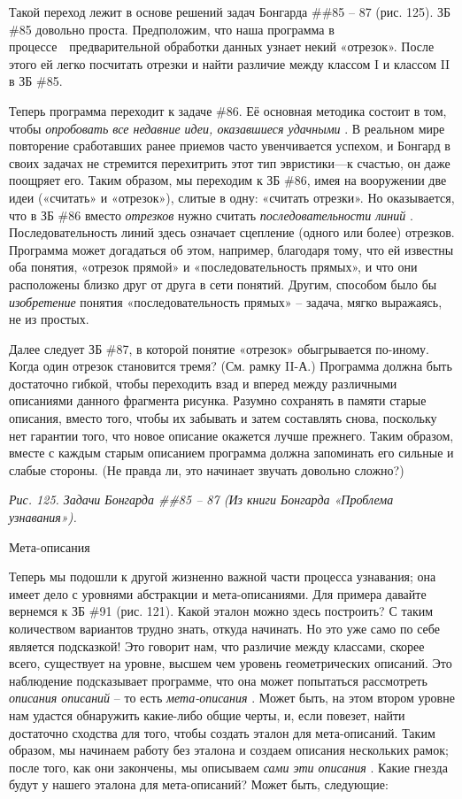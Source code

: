 \documentclass[../main.tex]{subfiles}
\begin{document}
Такой переход лежит в основе решений задач Бонгарда \#\#85 \--- 87 (рис. 125). ЗБ \#85 довольно проста. Предположим, что наша программа в процессе~~предварительной обработки данных узнает некий «отрезок». После этого ей легко посчитать отрезки и найти различие между классом I и классом II в ЗБ \#85.

Теперь программа переходит к задаче \#86. Её основная методика состоит в том, чтобы \emph{опробовать все недавние идеи, оказавшиеся удачными} . В реальном мире повторение сработавших ранее приемов часто увенчивается успехом, и Бонгард в своих задачах не стремится перехитрить этот тип эвристики---к счастью, он даже поощряет его. Таким образом, мы переходим к ЗБ \#86, имея на вооружении две идеи («считать» и «отрезок»), слитые в одну: «считать отрезки». Но оказывается, что в ЗБ \#86 вместо \emph{отрезков} нужно считать \emph{последовательности линий} . Последовательность линий здесь означает сцепление (одного или более) отрезков. Программа может догадаться об этом, например, благодаря тому, что ей известны оба понятия, «отрезок прямой» и «последовательность прямых», и что они расположены близко друг от друга в сети понятий. Другим, способом было бы \emph{изобретение} понятия «последовательность прямых» \--- задача, мягко выражаясь, не из простых.

Далее следует ЗБ \#87, в которой понятие «отрезок» обыгрывается по-иному. Когда один отрезок становится тремя? (См. рамку II-А.) Программа должна быть достаточно гибкой, чтобы переходить взад и вперед между различными описаниями данного фрагмента рисунка. Разумно сохранять в памяти старые описания, вместо того, чтобы их забывать и затем составлять снова, поскольку нет гарантии того, что новое описание окажется лучше прежнего. Таким образом, вместе с каждым старым описанием программа должна запоминать его сильные и слабые стороны. (Не правда ли, это начинает звучать довольно сложно?)

\emph{Рис. 125. Задачи Бонгарда \#\#85 \--- 87 (Из книги Бонгарда «Проблема узнавания»).}

Мета-описания

Теперь мы подошли к другой жизненно важной части процесса узнавания; она имеет дело с уровнями абстракции и мета-описаниями. Для примера давайте вернемся к ЗБ \#91 (рис. 121). Какой эталон можно здесь построить? С таким количеством вариантов трудно знать, откуда начинать. Но это уже само по себе является подсказкой! Это говорит нам, что различие между классами, скорее всего, существует на уровне, высшем чем уровень геометрических описаний. Это наблюдение подсказывает программе, что она может попытаться рассмотреть \emph{описания описаний} \--- то есть \emph{мета-описания} . Может быть, на этом втором уровне нам удастся обнаружить какие-либо общие черты, и, если повезет, найти достаточно сходства для того, чтобы создать эталон для мета-описаний. Таким образом, мы начинаем работу без эталона и создаем описания нескольких рамок; после того, как они закончены, мы описываем \emph{сами эти описания} . Какие гнезда будут у нашего эталона для мета-описаний? Может быть, следующие:
\end{document}

